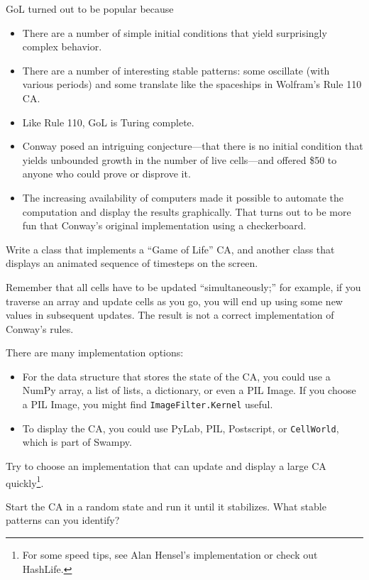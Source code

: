 \documentclass[10pt]{book}
\begin{document}
GoL turned out to be popular because

\begin{itemize}

\item There are a number of simple initial conditions that yield
surprisingly complex behavior.

\item There are a number of interesting stable patterns: some
oscillate (with various periods) and some translate like the
spaceships in Wolfram's Rule 110 CA.

\item Like Rule 110, GoL is Turing complete.

\item Conway posed an intriguing conjecture---that there is
no initial condition that yields unbounded growth in the number
of live cells---and offered \$50 to anyone who could prove
or disprove it.

\item The increasing availability of computers made it possible
to automate the computation and display the results graphically.
That turns out to be more fun that Conway's original implementation
using a checkerboard.

\end{itemize}


\begin{ex}

Write a class that implements a ``Game of Life'' CA, and another
class that displays an animated sequence of timesteps on the screen.

Remember that all cells have to be updated ``simultaneously;'' for
example, if you traverse an array and update cells as you go, you
will end up using some new values in subsequent updates.  The
result is not a correct implementation of Conway's rules.

There are many implementation options:

\begin{itemize}

\item For the data structure that stores the state of the CA, you
could use a NumPy array, a list of lists, a dictionary, or even
a PIL Image.  If you choose a PIL Image, you might find
{\tt ImageFilter.Kernel} useful.

\item To display the CA, you could use PyLab, PIL, Postscript, or
{\tt CellWorld}, which is part of Swampy.

\end{itemize}

Try to choose an implementation that can update and display a large CA
quickly\footnote{For some speed tips, see Alan Hensel's implementation
or check out HashLife.}.

Start the CA in a random state and run it until it stabilizes.
What stable patterns can you identify?

\end{ex}
\end{document}

